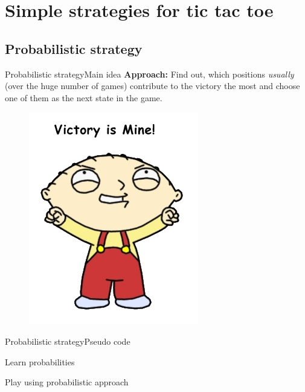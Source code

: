 \documentclass[aspectratio=169]{beamer}
\begin{document}
\section{Simple strategies for tic tac toe}

\subsection{Probabilistic strategy}

\begin{frame}{Probabilistic strategy}{Main idea}
\textbf{Approach:}
Find out, which positions \textit{usually} (over the huge number of games) contribute to the victory the most and choose one of them as the next state in the game.
\begin{figure}
	\includegraphics[scale = 0.5]{victory.jpg}	
\end{figure}
\end{frame}

\begin{frame}{Probabilistic strategy}{Pseudo code}
\begin{block}{Learn probabilities}
\Probabilistic

\end{block}
\begin{block}{Play using probabilistic approach}
\ProbabilisticPlay
\end{block}
\end{frame}
\end{document}
